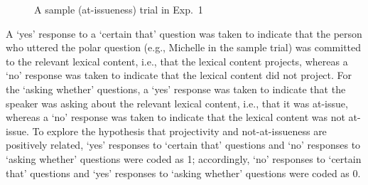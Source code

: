 \documentclass[11pt,fleqn]{article}
\newcommand{\6}{\mbox{$[\hspace*{-.6mm}[$}}
\newcommand{\9}{\mbox{$]\hspace*{-.6mm}]$}}
\begin{document}
\begin{figure}[h!]
\begin{center}
\end{center}
\caption{A sample (at-issueness) trial in Exp.~1}\label{f-trial-exp1}
\end{figure}

A `yes' response to a `certain that' question was taken to indicate that the person who uttered the polar question (e.g., Michelle in the sample trial) was committed to the relevant lexical content, i.e., that the lexical content projects, whereas a `no' response was taken to indicate that the lexical content did not project. For the `asking whether' questions, a `yes'  response was taken to indicate that the speaker was asking about the relevant lexical content, i.e., that it was at-issue, whereas a `no' response was taken to indicate that the lexical content was not at-issue. To explore the hypothesis that projectivity and not-at-issueness are positively related,  `yes' responses to `certain that' questions and `no' responses to `asking whether' questions were coded as 1; accordingly, `no' responses to `certain that' questions and `yes' responses to `asking whether' questions were coded as 0.
\end{document}
